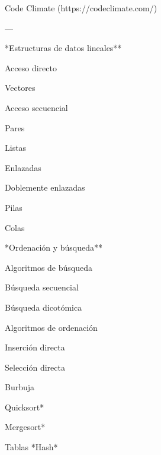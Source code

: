 \begin{longenum}
\begin{longenum}
\begin{longenum}
            \item [Code Climate](https://codeclimate.com/)
        \end{longenum}
    \end{longenum}
    \item ---
    \item **Estructuras de datos lineales**
    \begin{longenum}
        \item Acceso directo
        \begin{longenum}
            \item Vectores
        \end{longenum}
        \item Acceso secuencial
        \begin{longenum}
            \item Pares
            \item Listas
            \begin{longenum}
                \item Enlazadas
                \item Doblemente enlazadas
            \end{longenum}
            \item Pilas
            \item Colas
        \end{longenum}
    \end{longenum}
    \item **Ordenación y búsqueda**
    \begin{longenum}
        \item Algoritmos de búsqueda
        \begin{longenum}
            \item Búsqueda secuencial
            \item Búsqueda dicotómica
        \end{longenum}
        \item Algoritmos de ordenación
        \begin{longenum}
            \item Inserción directa
            \item Selección directa
            \item Burbuja
            \item *Quicksort*
            \item *Mergesort*
        \end{longenum}
        \item Tablas *Hash*

\end{longenum}
\end{longenum}
